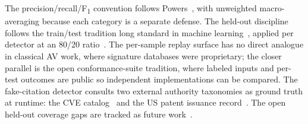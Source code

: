 The precision/recall/F\textsubscript{1} convention follows
Powers~\cite{Powers:2011:evaluation-precision-recall}, with unweighted
macro-averaging because each category is a separate defense. The
held-out discipline follows the train/test tradition long standard in
machine learning~\cite{Kohavi:1995:cross-validation}, applied per
detector at an 80/20 ratio~\cite{primitivehub:2026:adr-0038}. The
per-sample replay surface has no direct analogue in classical AV work,
where signature databases were proprietary; the closer parallel is the
open conformance-suite tradition, where labeled inputs and per-test
outcomes are public so independent implementations can be compared. The
fake-citation detector consults two external authority taxonomies as
ground truth at runtime: the CVE catalog~\cite{MITRE:CVE:1999:taxonomy}
and the US patent issuance record~\cite{USPTO:1790:patent-system}. The
open held-out coverage gaps are tracked as future
work~\cite{primitivehub:2026:eval-limitations}.
